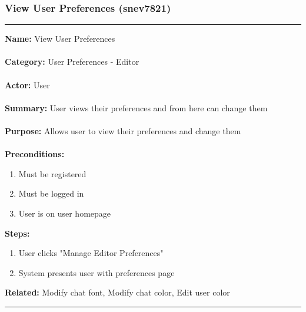 \documentclass[11pt]{report}
\begin{document}
\subsubsection{View User Preferences (snev7821)}
\vspace{2pt}
\hrule
\vspace{8pt}
	\noindent\textbf{Name:} View User Preferences \\ \\
	\textbf{Category:} User Preferences - Editor  \\ \\
	\textbf{Actor:} User \\ \\
	\textbf{Summary:} User views their preferences and from here can change them \\ \\
	\textbf{Purpose:} Allows user to view their preferences and change them \\ \\
	\textbf{Preconditions:} 
	\begin{enumerate}
		\item Must be registered
		\item Must be logged in
		\item User is on user homepage
	\end{enumerate}
	\textbf{Steps:}
	\begin{enumerate}
		\item User clicks "Manage Editor Preferences"
		\item System presents user with preferences page
	\end{enumerate}
	\textbf{Related:} Modify chat font, Modify chat color, Edit user color
\vspace{8pt}
\hrule

\newpage
\end{document}
